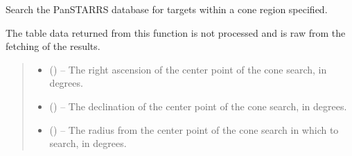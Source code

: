 \documentclass[letterpaper,11pt,english]{sphinxmanual}
\begin{document}
\begin{savenotes}
\begin{fulllineitems}
\begin{savenotes}\begin{fulllineitems}
\label{\detokenize{code/opihiexarata.photometry.panstarrs:opihiexarata.photometry.panstarrs.PanstarrsMastWebAPIEngine.cone_search}}
\pysigstartsignatures
{}
\pysigstopsignatures
\sphinxAtStartPar
Search the PanSTARRS database for targets within a cone region
specified.

\sphinxAtStartPar
The table data returned from this function is not processed and is raw
from the fetching of the results.
\begin{quote}\begin{description}
\begin{itemize}
\item {} 
\sphinxAtStartPar
{} () – The right ascension of the center point of the cone search, in
degrees.

\item {} 
\sphinxAtStartPar
{} () – The declination of the center point of the cone search, in
degrees.

\item {} 
\sphinxAtStartPar
{} () – The radius from the center point of the cone search in which to
search, in degrees.


\end{itemize}
\end{description}
\end{quote}
\end{fulllineitems}
\end{savenotes}
\end{fulllineitems}
\end{savenotes}
\end{document}

